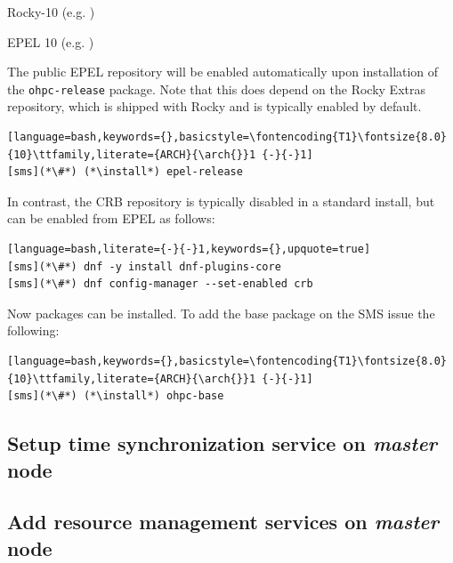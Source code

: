 \documentclass[letterpaper]{article}
\newcommand{\arch}{x86\_64}
\newcommand{\install}{dnf -y install}
\begin{document}
\begin{itemize*}
\item Rocky-10
  (e.g. \href{http://download.rockylinux.org/pub/rocky/10/}
             {\color{blue}{http://download.rockylinux.org/pub/rocky/10/}} )
\item EPEL 10 (e.g. \href{http://download.fedoraproject.org/pub/epel/10/}
                        {\color{blue}{http://download.fedoraproject.org/pub/epel/10/}} )
\end{itemize*}

\noindent The public EPEL repository will be enabled automatically upon
installation of the \texttt{ohpc-release} package. Note that this does depend
on the Rocky Extras repository, which is shipped with Rocky and is typically
enabled by default.

\begin{lstlisting}[language=bash,keywords={},basicstyle=\fontencoding{T1}\fontsize{8.0}{10}\ttfamily,literate={ARCH}{\arch{}}1 {-}{-}1]
[sms](*\#*) (*\install*) epel-release
\end{lstlisting}

\noindent In contrast, the CRB repository is typically disabled in a
standard install, but can be enabled from EPEL as follows:

\begin{lstlisting}[language=bash,literate={-}{-}1,keywords={},upquote=true]
[sms](*\#*) dnf -y install dnf-plugins-core
[sms](*\#*) dnf config-manager --set-enabled crb
\end{lstlisting}

Now \OHPC{} packages can be installed. To add the base package on the SMS
issue the following:
\begin{lstlisting}[language=bash,keywords={},basicstyle=\fontencoding{T1}\fontsize{8.0}{10}\ttfamily,literate={ARCH}{\arch{}}1 {-}{-}1]
[sms](*\#*) (*\install*) ohpc-base
\end{lstlisting}





\subsection{Setup time synchronization service on {\em master} node} \label{sec:add_ntp}


\subsection{Add resource management services on {\em master} node} \label{sec:add_rm}

\end{document}
